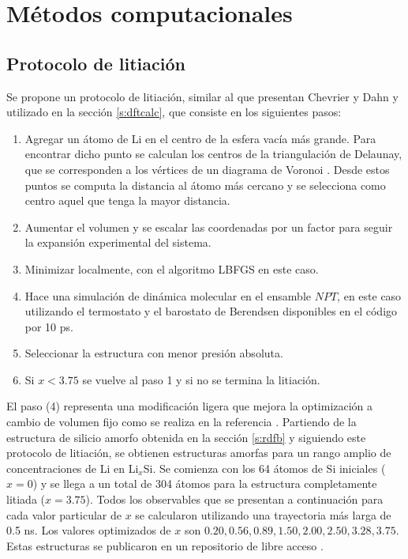 \section{Métodos computacionales}

\subsection{Protocolo de litiación}

Se propone un protocolo de litiación, similar al que presentan Chevrier y Dahn
\cite{chevrier2009} y utilizado en la sección \ref{s:dftcalc}, que consiste 
en los siguientes pasos:
\begin{enumerate}
    \item Agregar un átomo de Li en el centro de la esfera vacía más grande.
        Para encontrar dicho punto se calculan los centros de la triangulación 
        de Delaunay, que se corresponden a los vértices de un diagrama de 
        Voronoi \cite{aurenhammer1991}. Desde estos puntos se computa la 
        distancia al átomo más cercano y se selecciona como centro aquel que 
        tenga la mayor distancia. 
    \item Aumentar  el volumen y se escalar las coordenadas por un factor para
        seguir la expansión experimental del sistema.
    \item Minimizar localmente, con el algoritmo LBFGS en este caso.
    \item Hace una simulación de dinámica molecular en el ensamble $NPT$, en 
        este caso utilizando el termostato y el barostato de Berendsen 
        disponibles en el código  \cite{dftb+} por 10 ps. 
    \item Seleccionar la estructura con menor presión absoluta.
    \item Si $x < 3.75$ se vuelve al paso 1 y si no se termina la litiación.
\end{enumerate}
El paso (4) representa una modificación ligera que mejora la optimización a 
cambio de volumen fijo como se realiza en la referencia \cite{chevrier2009}.
Partiendo de la estructura de silicio amorfo obtenida en la sección 
\ref{s:rdfb} y siguiendo este protocolo de litiación, se obtienen estructuras
amorfas para un rango amplio de concentraciones de Li en Li$_x$Si. Se comienza
con los 64 átomos de Si iniciales ($x=0$) y se llega a un total de 304 átomos
para la estructura completamente litiada ($x=3.75$). Todos los observables que
se presentan a continuación para cada valor particular de $x$ se calcularon 
utilizando una trayectoria más larga de 0.5 ns. Los valores optimizados de $x$
son $0.20, 0.56, 0.89, 1.50, 2.00, 2.50, 3.28, 3.75$. Estas estructuras se 
publicaron en un repositorio de libre acceso \cite{dftb_lisi_amorphous}.
